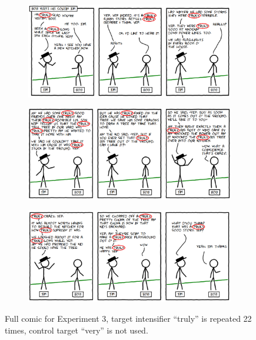 \documentclass[10pt,letterpaper]{article}
\begin{document}
\begin{figure}
        \centering
        \begin{subfigure}[b]{0.45\textwidth}
                \includegraphics[width=\textwidth]{analysis_files_for_writeup/images/story1_truly_circles.png}
        \end{subfigure}%
        
        \begin{subfigure}[b]{0.45\textwidth}
                \includegraphics[width=\textwidth]{analysis_files_for_writeup/images/story2_truly_circles.png}
        \end{subfigure}
        
        \begin{subfigure}[b]{0.45\textwidth}
                \includegraphics[width=\textwidth]{analysis_files_for_writeup/images/story3_truly_circles.png}
        \end{subfigure}
        \caption{Full comic for Experiment 3, target intensifier ``truly'' is repeated 22 times, control target ``very'' is not used.}\label{exp3-story}
\end{figure}




\setlength{\bibleftmargin}{.125in}
\setlength{\bibindent}{-\bibleftmargin}


\end{document}
